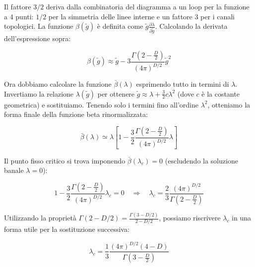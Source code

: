 \noindent Il fattore $3/2$ deriva dalla combinatoria del diagramma a un loop per la funzione a 4 punti: $1/2$ per la simmetria delle linee interne e un fattore $3$ per i canali topologici. La funzione $\beta(\tilde{g})$ è definita come $\tilde{g} \frac{\partial \lambda}{\partial \tilde{g}}$. Calcolando la derivata dell'espressione sopra:

\begin{equation}
\beta(\tilde{g}) \approx \tilde{g} - 3 \frac{\Gamma(2 - \frac{D}{2})}{(4\pi)^{D/2}} \tilde{g}^2
\end{equation}

\noindent Ora dobbiamo calcolare la funzione $\bar{\beta}(\lambda)$ esprimendo tutto in termini di $\lambda$. Invertiamo la relazione $\lambda(\tilde{g})$ per ottenere $\tilde{g} \approx \lambda + \frac{3}{2} c \lambda^2$ (dove $c$ è la costante geometrica) e sostituiamo.
Tenendo solo i termini fino all'ordine $\lambda^2$, otteniamo la forma finale della funzione beta rinormalizzata:

\begin{tcolorbox}[colback=colorA!10, colframe=colorB!60!colorA,  title=\textbf{Funzione $\bar{\beta}(\lambda)$}]
\begin{equation}
\bar{\beta}(\lambda) \simeq \lambda \left[ 1 - \frac{3}{2} \frac{\Gamma(2 - \frac{D}{2})}{(4\pi)^{D/2}} \lambda \right]
\end{equation}
\end{tcolorbox}


\noindent Il punto fisso critico si trova imponendo $\bar{\beta}(\lambda_c) = 0$ (escludendo la soluzione banale $\lambda=0$):

\begin{equation}
1 - \frac{3}{2} \frac{\Gamma(2 - \frac{D}{2})}{(4\pi)^{D/2}} \lambda_c = 0 \quad \Longrightarrow \quad \lambda_c = \frac{2}{3} \frac{(4\pi)^{D/2}}{\Gamma(2 - \frac{D}{2})}
\end{equation}

\noindent Utilizzando la proprietà $\Gamma(2 - D/2) = \frac{\Gamma(3 - D/2)}{2 - D/2}$, possiamo riscrivere $\lambda_c$ in una forma utile per la sostituzione successiva:

\begin{tcolorbox}[colback=colorA!10, colframe=colorB!60!colorA,  title=\textbf{Punto fisso $\lambda_c$}]
\begin{equation}
\lambda_c = \frac{1}{3} \frac{(4\pi)^{D/2} (4-D)}{\Gamma(3 - \frac{D}{2})}
\end{equation}
\end{tcolorbox}

